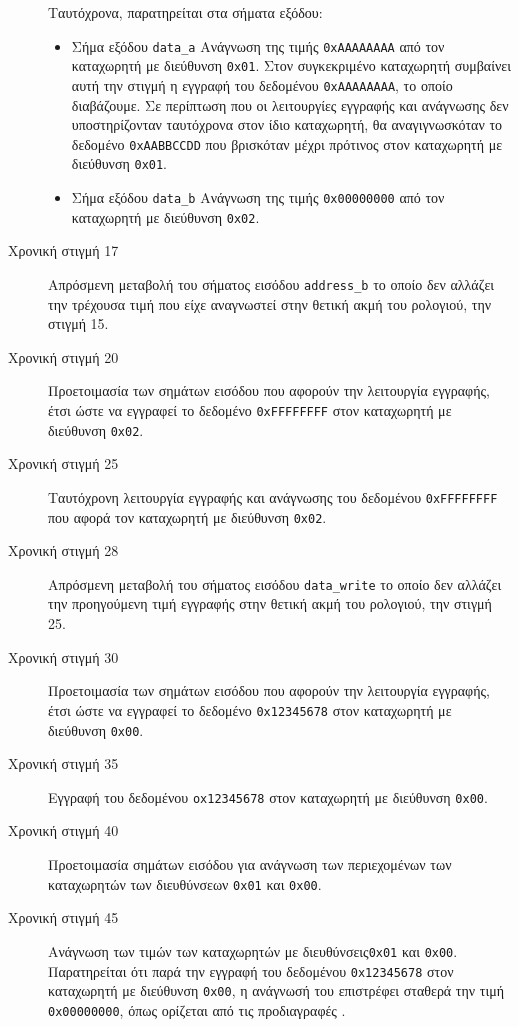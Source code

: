 \documentclass[11pt]{extarticle}
\begin{document}
\begin{description}
Ταυτόχρονα, παρατηρείται στα σήματα εξόδου:
\begin{itemize}
    \item Σήμα εξόδου \texttt{data\_a} \newline Ανάγνωση της τιμής \texttt{0xAAAAAAAA} από τον καταχωρητή με διεύθυνση \texttt{0x01}.
    Στον συγκεκριμένο καταχωρητή συμβαίνει αυτή την στιγμή η εγγραφή του δεδομένου \texttt{0xAAAAAAAA}, το οποίο διαβάζουμε.
    Σε περίπτωση που οι λειτουργίες εγγραφής και ανάγνωσης δεν υποστηρίζονταν ταυτόχρονα στον ίδιο καταχωρητή, θα αναγιγνωσκόταν το δεδομένο \texttt{0xAABBCCDD} που βρισκόταν μέχρι πρότινος στον καταχωρητή με διεύθυνση \texttt{0x01}.
    \item Σήμα εξόδου \texttt{data\_b} \newline Ανάγνωση της τιμής \texttt{0x00000000} από τον καταχωρητή με διεύθυνση \texttt{0x02}.
\end{itemize}
\item[Χρονική στιγμή 17] \hfill \newline
Απρόσμενη μεταβολή του σήματος εισόδου \texttt{address\_b} το οποίο δεν αλλάζει την τρέχουσα τιμή που είχε αναγνωστεί στην θετική ακμή του ρολογιού, την στιγμή 15.
\item[Χρονική στιγμή 20] \hfill \newline
Προετοιμασία των σημάτων εισόδου που αφορούν την λειτουργία εγγραφής, έτσι ώστε να εγγραφεί το δεδομένο \texttt{0xFFFFFFFF} στον καταχωρητή με διεύθυνση \texttt{0x02}.
\item[Χρονική στιγμή 25] \hfill \newline
Ταυτόχρονη λειτουργία εγγραφής και ανάγνωσης του δεδομένου \texttt{0xFFFFFFFF} που αφορά τον καταχωρητή με διεύθυνση \texttt{0x02}.
\item[Χρονική στιγμή 28] \hfill \newline
Απρόσμενη μεταβολή του σήματος εισόδου \texttt{data\_write} το οποίο δεν αλλάζει την προηγούμενη τιμή εγγραφής στην θετική ακμή του ρολογιού, την στιγμή 25.
\item[Χρονική στιγμή 30] \hfill \newline
Προετοιμασία των σημάτων εισόδου που αφορούν την λειτουργία εγγραφής, έτσι ώστε να εγγραφεί το δεδομένο \texttt{0x12345678} στον καταχωρητή με διεύθυνση \texttt{0x00}.
\item[Χρονική στιγμή 35] \hfill \newline
Εγγραφή του δεδομένου \texttt{ox12345678} στον καταχωρητή με διεύθυνση \texttt{0x00}.
\item[Χρονική στιγμή 40] \hfill \newline
Προετοιμασία σημάτων εισόδου για ανάγνωση των περιεχομένων των καταχωρητών των διευθύνσεων \texttt{0x01} και \texttt{0x00}.
\item[Χρονική στιγμή 45] \hfill \newline
Ανάγνωση των τιμών των καταχωρητών με διευθύνσεις\texttt{0x01} και \texttt{0x00}.
Παρατηρείται ότι παρά την εγγραφή του δεδομένου \texttt{0x12345678} στον καταχωρητή με διεύθυνση \texttt{0x00}, η ανάγνωσή του επιστρέφει σταθερά την τιμή \texttt{0x00000000}, όπως ορίζεται από τις προδιαγραφές \cite{spec}.
\end{description}
\end{document}
